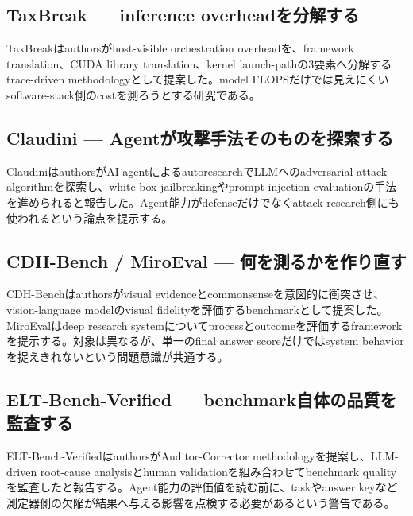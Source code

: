 \begingroup\raggedright
\subsection{TaxBreak — inference overheadを分解する}
\par\endgroup

TaxBreakはauthorsがhost-visible orchestration overheadを、framework translation、CUDA library translation、kernel launch-pathの3要素へ分解するtrace-driven methodologyとして提案した。model FLOPSだけでは見えにくいsoftware-stack側のcostを測ろうとする研究である。\autocite{src-198727200361}


\begingroup\raggedright
\subsection{Claudini — Agentが攻撃手法そのものを探索する}
\par\endgroup

ClaudiniはauthorsがAI agentによるautoresearchでLLMへのadversarial attack algorithmを探索し、white-box jailbreakingやprompt-injection evaluationの手法を進められると報告した。Agent能力がdefenseだけでなくattack research側にも使われるという論点を提示する。\autocite{src-bb83c9c55568}


\begingroup\raggedright
\subsection{CDH-Bench / MiroEval — 何を測るかを作り直す}
\par\endgroup

CDH-Benchはauthorsがvisual evidenceとcommonsenseを意図的に衝突させ、vision-language modelのvisual fidelityを評価するbenchmarkとして提案した。MiroEvalはdeep research systemについてprocessとoutcomeを評価するframeworkを提示する。対象は異なるが、単一のfinal answer scoreだけではsystem behaviorを捉えきれないという問題意識が共通する。\autocite{src-4553a7bbd23e,src-5d84874f2d03}


\begingroup\raggedright
\subsection{ELT-Bench-Verified — benchmark自体の品質を監査する}
\par\endgroup

ELT-Bench-VerifiedはauthorsがAuditor-Corrector methodologyを提案し、LLM-driven root-cause analysisとhuman validationを組み合わせてbenchmark qualityを監査したと報告する。Agent能力の評価値を読む前に、taskやanswer keyなど測定器側の欠陥が結果へ与える影響を点検する必要があるという警告である。\autocite{src-a27679e5527b}


